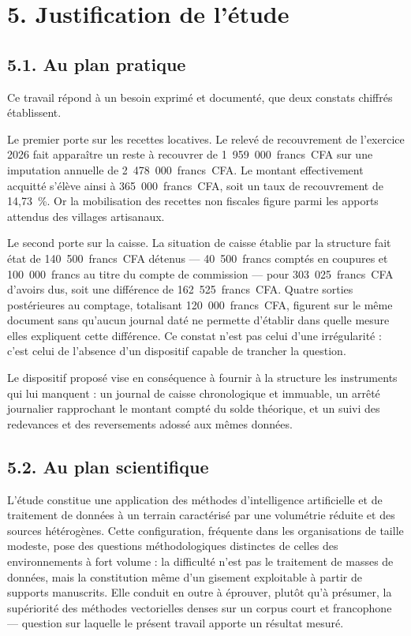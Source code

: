 \section*{5. Justification de l'étude}

\subsection*{5.1. Au plan pratique}

Ce travail répond à un besoin exprimé et documenté, que deux constats chiffrés établissent.

Le premier porte sur les recettes locatives. Le relevé de recouvrement de l'exercice 2026 fait apparaître un reste à recouvrer de 1~959~000~francs~CFA sur une imputation annuelle de 2~478~000~francs~CFA. Le montant effectivement acquitté s'élève ainsi à 365~000~francs~CFA, soit un taux de recouvrement de 14,73~\%. Or la mobilisation des recettes non fiscales figure parmi les apports attendus des villages artisanaux.

Le second porte sur la caisse. La situation de caisse établie par la structure fait état de 140~500~francs~CFA détenus --- 40~500~francs comptés en coupures et 100~000~francs au titre du compte de commission --- pour 303~025~francs~CFA d'avoirs dus, soit une différence de 162~525~francs~CFA. Quatre sorties postérieures au comptage, totalisant 120~000~francs~CFA, figurent sur le même document sans qu'aucun journal daté ne permette d'établir dans quelle mesure elles expliquent cette différence. Ce constat n'est pas celui d'une irrégularité : c'est celui de l'absence d'un dispositif capable de trancher la question.

Le dispositif proposé vise en conséquence à fournir à la structure les instruments qui lui manquent : un journal de caisse chronologique et immuable, un arrêté journalier rapprochant le montant compté du solde théorique, et un suivi des redevances et des reversements adossé aux mêmes données.

\subsection*{5.2. Au plan scientifique}

L'étude constitue une application des méthodes d'intelligence artificielle et de traitement de données à un terrain caractérisé par une volumétrie réduite et des sources hétérogènes. Cette configuration, fréquente dans les organisations de taille modeste, pose des questions méthodologiques distinctes de celles des environnements à fort volume : la difficulté n'est pas le traitement de masses de données, mais la constitution même d'un gisement exploitable à partir de supports manuscrits. Elle conduit en outre à éprouver, plutôt qu'à présumer, la supériorité des méthodes vectorielles denses sur un corpus court et francophone --- question sur laquelle le présent travail apporte un résultat mesuré.

